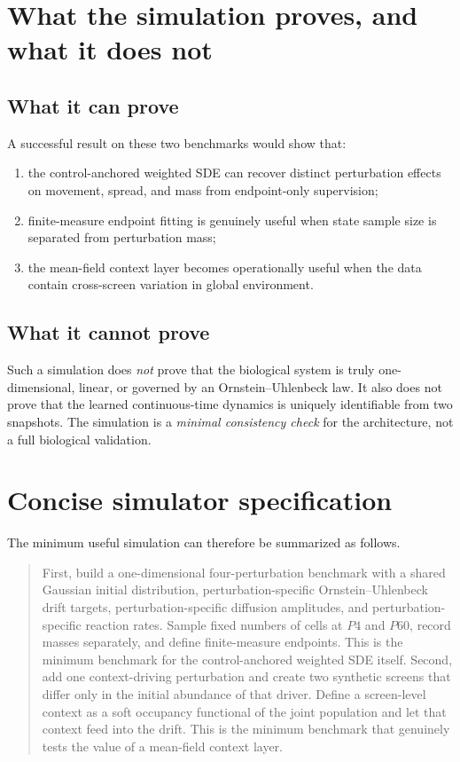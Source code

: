 \documentclass[11pt]{article}
\begin{document}
\section{What the simulation proves, and what it does not}

\subsection{What it can prove}

A successful result on these two benchmarks would show that:
\begin{enumerate}[label=(\roman*),leftmargin=2.2em]
    \item the control-anchored weighted SDE can recover distinct perturbation effects on movement, spread, and mass from endpoint-only supervision;
    \item finite-measure endpoint fitting is genuinely useful when state sample size is separated from perturbation mass;
    \item the mean-field context layer becomes operationally useful when the data contain cross-screen variation in global environment.
\end{enumerate}

\subsection{What it cannot prove}

Such a simulation does \emph{not} prove that the biological system is truly one-dimensional, linear, or governed by an Ornstein--Uhlenbeck law. It also does not prove that the learned continuous-time dynamics is uniquely identifiable from two snapshots. The simulation is a \emph{minimal consistency check} for the architecture, not a full biological validation.

\section{Concise simulator specification}

The minimum useful simulation can therefore be summarized as follows.

\begin{quote}
First, build a one-dimensional four-perturbation benchmark with a shared Gaussian initial distribution, perturbation-specific Ornstein--Uhlenbeck drift targets, perturbation-specific diffusion amplitudes, and perturbation-specific reaction rates. Sample fixed numbers of cells at $P4$ and $P60$, record masses separately, and define finite-measure endpoints. This is the minimum benchmark for the control-anchored weighted SDE itself. Second, add one context-driving perturbation and create two synthetic screens that differ only in the initial abundance of that driver. Define a screen-level context as a soft occupancy functional of the joint population and let that context feed into the drift. This is the minimum benchmark that genuinely tests the value of a mean-field context layer.
\end{quote}
\end{document}
